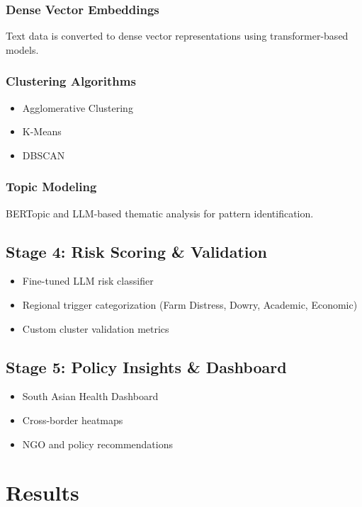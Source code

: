 \documentclass[12pt,a4paper]{article}
\begin{document}
\subsubsection{Dense Vector Embeddings}
Text data is converted to dense vector representations using transformer-based models.

\subsubsection{Clustering Algorithms}
\begin{itemize}
    \item Agglomerative Clustering
    \item K-Means
    \item DBSCAN
\end{itemize}

\subsubsection{Topic Modeling}
BERTopic and LLM-based thematic analysis for pattern identification.

\subsection{Stage 4: Risk Scoring \& Validation}
\begin{itemize}
    \item Fine-tuned LLM risk classifier
    \item Regional trigger categorization (Farm Distress, Dowry, Academic, Economic)
    \item Custom cluster validation metrics
\end{itemize}

\subsection{Stage 5: Policy Insights \& Dashboard}
\begin{itemize}
    \item South Asian Health Dashboard
    \item Cross-border heatmaps
    \item NGO and policy recommendations
\end{itemize}

\section{Results}
\end{document}

